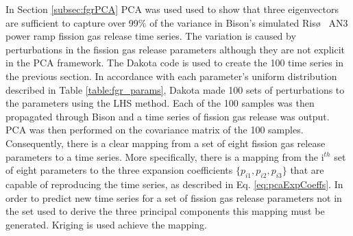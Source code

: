 In Section \ref{subsec:fgrPCA} \ac{PCA} was used used to show that three eigenvectors are sufficient to capture over 99\% of the variance in Bison's simulated Ris\o~ AN3 power ramp fission gas release time series. The variation is caused by perturbations in the fission gas release parameters although they are not explicit in the \ac{PCA} framework. The Dakota code is used to create the 100 time series in the previous section. In accordance with each parameter's uniform distribution described in Table \ref{table:fgr_params}, Dakota made 100 sets of perturbations to the parameters using the \ac{LHS} method. Each of the 100 samples was then propagated through Bison and a time series of fission gas release was output. \ac{PCA} was then performed on the covariance matrix of the 100 samples. Consequently, there is a clear mapping from a set of eight fission gas release parameters to a time series. More specifically, there is a mapping from the i$^{th}$ set of eight parameters to the three expansion coefficients $\lbrace p_{i1}, p_{i2}, p_{i3} \rbrace$ that are capable of reproducing the time series, as described in Eq. \ref{eq:pcaExpCoeffs}. In order to predict new time series for a set of fission gas release parameters not in the set used to derive the three principal components this mapping must be generated. Kriging is used achieve the mapping.  


%
